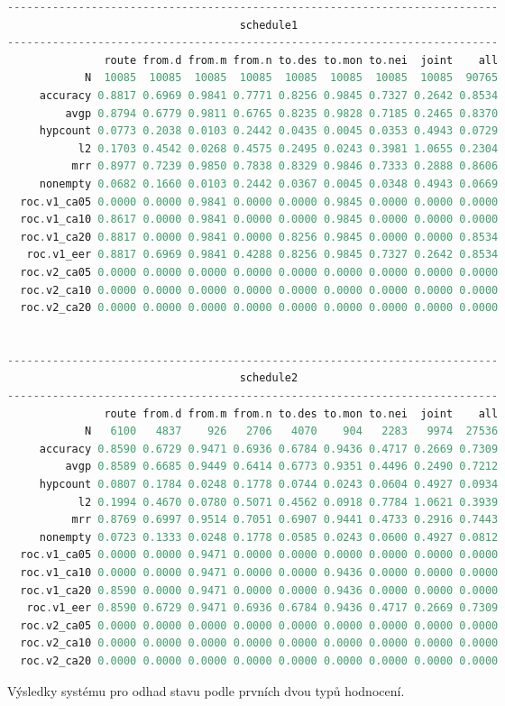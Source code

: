 {
\footnotesize
\begin{example}
\begin{lstlisting}[language=c,frame=none]
----------------------------------------------------------------------------
                                    schedule1
----------------------------------------------------------------------------
               route from.d from.m from.n to.des to.mon to.nei  joint    all
            N  10085  10085  10085  10085  10085  10085  10085  10085  90765
     accuracy 0.8817 0.6969 0.9841 0.7771 0.8256 0.9845 0.7327 0.2642 0.8534
         avgp 0.8794 0.6779 0.9811 0.6765 0.8235 0.9828 0.7185 0.2465 0.8370
     hypcount 0.0773 0.2038 0.0103 0.2442 0.0435 0.0045 0.0353 0.4943 0.0729
           l2 0.1703 0.4542 0.0268 0.4575 0.2495 0.0243 0.3981 1.0655 0.2304
          mrr 0.8977 0.7239 0.9850 0.7838 0.8329 0.9846 0.7333 0.2888 0.8606
     nonempty 0.0682 0.1660 0.0103 0.2442 0.0367 0.0045 0.0348 0.4943 0.0669
  roc.v1_ca05 0.0000 0.0000 0.9841 0.0000 0.0000 0.9845 0.0000 0.0000 0.0000
  roc.v1_ca10 0.8617 0.0000 0.9841 0.0000 0.0000 0.9845 0.0000 0.0000 0.0000
  roc.v1_ca20 0.8817 0.0000 0.9841 0.0000 0.8256 0.9845 0.0000 0.0000 0.8534
   roc.v1_eer 0.8817 0.6969 0.9841 0.4288 0.8256 0.9845 0.7327 0.2642 0.8534
  roc.v2_ca05 0.0000 0.0000 0.0000 0.0000 0.0000 0.0000 0.0000 0.0000 0.0000
  roc.v2_ca10 0.0000 0.0000 0.0000 0.0000 0.0000 0.0000 0.0000 0.0000 0.0000
  roc.v2_ca20 0.0000 0.0000 0.0000 0.0000 0.0000 0.0000 0.0000 0.0000 0.0000


----------------------------------------------------------------------------
                                    schedule2
----------------------------------------------------------------------------
               route from.d from.m from.n to.des to.mon to.nei  joint    all
            N   6100   4837    926   2706   4070    904   2283   9974  27536
     accuracy 0.8590 0.6729 0.9471 0.6936 0.6784 0.9436 0.4717 0.2669 0.7309
         avgp 0.8589 0.6685 0.9449 0.6414 0.6773 0.9351 0.4496 0.2490 0.7212
     hypcount 0.0807 0.1784 0.0248 0.1778 0.0744 0.0243 0.0604 0.4927 0.0934
           l2 0.1994 0.4670 0.0780 0.5071 0.4562 0.0918 0.7784 1.0621 0.3939
          mrr 0.8769 0.6997 0.9514 0.7051 0.6907 0.9441 0.4733 0.2916 0.7443
     nonempty 0.0723 0.1333 0.0248 0.1778 0.0585 0.0243 0.0600 0.4927 0.0812
  roc.v1_ca05 0.0000 0.0000 0.9471 0.0000 0.0000 0.0000 0.0000 0.0000 0.0000
  roc.v1_ca10 0.0000 0.0000 0.9471 0.0000 0.0000 0.9436 0.0000 0.0000 0.0000
  roc.v1_ca20 0.8590 0.0000 0.9471 0.0000 0.0000 0.9436 0.0000 0.0000 0.0000
   roc.v1_eer 0.8590 0.6729 0.9471 0.6936 0.6784 0.9436 0.4717 0.2669 0.7309
  roc.v2_ca05 0.0000 0.0000 0.0000 0.0000 0.0000 0.0000 0.0000 0.0000 0.0000
  roc.v2_ca10 0.0000 0.0000 0.0000 0.0000 0.0000 0.0000 0.0000 0.0000 0.0000
  roc.v2_ca20 0.0000 0.0000 0.0000 0.0000 0.0000 0.0000 0.0000 0.0000 0.0000
\end{lstlisting}
\caption{Výsledky systému pro odhad stavu podle prvních dvou typů hodnocení.}
\label{ex:res1}
\end{example}

}
